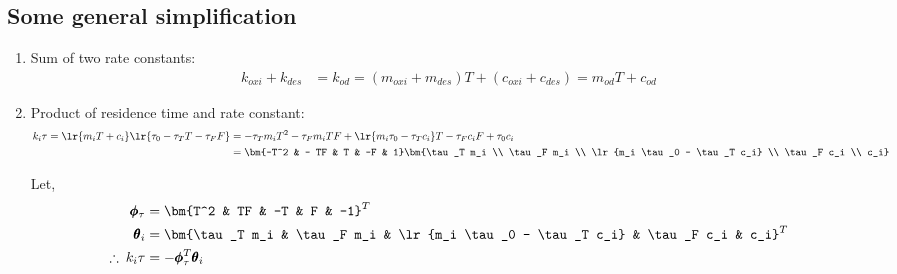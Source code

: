 \subsection{Some general simplification}
\begin{enumerate}
        \item Sum of two rate constants:
        \begin{align}
                k_{oxi} + k_{des} &= k_{od} = (m_{oxi} + m_{des}) T + (c_{oxi} + c_{des}) = m_{od} T + c_{od}
        \end{align}

        \item Product of residence time and rate constant:
        \begin{align*}
        k_i \tau  = \lr{m_i T + c_i} \lr{\tau_0 - \tau_T T - \tau_F F}
                  &= - \tau_T m_i T^2 - \tau_F m_i TF + \lr{m_i \tau_0 - \tau_T c_i} T - \tau_F c_i F + \tau_0 c_i \\
                  &= \bm{-T^2 & - TF & T & -F & 1} \bm{\tau_T m_i \\
                                                       \tau_F m_i \\
                                                       \lr{m_i \tau_0 - \tau_T c_i} \\
                                                       \tau_F c_i \\
                                                       c_i}
        \end{align*}

        Let,
        \begin{align}
                \pmb \phi_\tau &= \bm{T^2 & TF & -T & F & -1}^T  \label{eqn::phi_tau}\\
                \pmb \theta_i &= \bm{\tau_T m_i &
                                \tau_F m_i &
                                \lr{m_i \tau_0 - \tau_T c_i} &
                                \tau_F c_i &
                                c_i}^T          \label{eqn::theta_i}\\
                \therefore \: k_i \tau &= - \pmb \phi_\tau^T \pmb \theta_i   \label{eqn::tau_ki}
        \end{align}



\end{enumerate}
